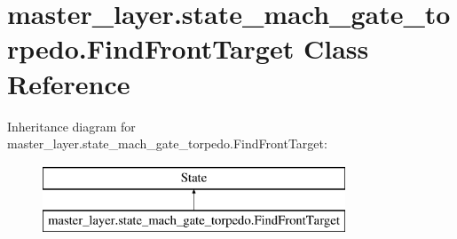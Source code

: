 \hypertarget{classmaster__layer_1_1state__mach__gate__torpedo_1_1FindFrontTarget}{}\section{master\+\_\+layer.\+state\+\_\+mach\+\_\+gate\+\_\+torpedo.\+Find\+Front\+Target Class Reference}
\label{classmaster__layer_1_1state__mach__gate__torpedo_1_1FindFrontTarget}
Inheritance diagram for master\+\_\+layer.\+state\+\_\+mach\+\_\+gate\+\_\+torpedo.\+Find\+Front\+Target\+:\begin{figure}[H]
\begin{center}
\leavevmode
\includegraphics[height=2.000000cm]{classmaster__layer_1_1state__mach__gate__torpedo_1_1FindFrontTarget}
\end{center}
\end{figure}

